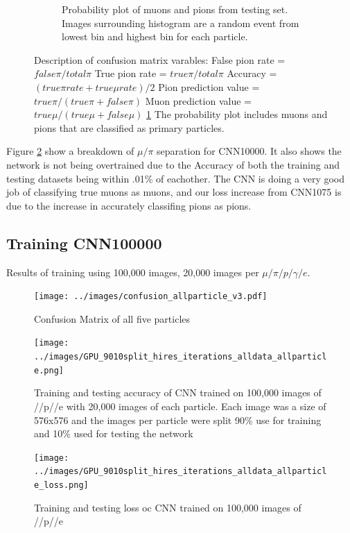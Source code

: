 \begin{figure}[htp!]
\begin{subfigure}[b]{\textwidth}
	\caption{Probability plot of muons and pions from testing set. Images surrounding histogram are a random event from lowest bin and highest bin for each particle.}
	\label{fig:prob_plot}
	\end{subfigure}
\caption{Description of confusion matrix varables: False pion rate = $false \pi/ total \pi$ True pion rate = $true \pi/total \pi$ Accuracy = $(true \pi rate + true \mu rate)/2$ Pion prediction value = $true \pi/(true \pi + false \pi)$ Muon prediction value = $true \mu/(true \mu + false \mu)$ \ref{fig:prob_plot} The probability plot includes muons and pions that are classified as primary particles.}
\label{fig:CNN_train}
\end{figure}

Figure \ref{fig:CNN_train} show a breakdown of $\mu/\pi$ separation for CNN10000. It also shows the network is not being overtrained due to the Accuracy of both the training and testing datasets being within .01\% of eachother. The CNN is doing a very good job of classifying true muons as muons, and our loss increase from CNN1075 is due to the increase in accurately classifing pions as pions. 



\subsection{Training CNN100000}
Results of training using 100,000 images, 20,000 images per $\mu/\pi/p/\gamma/e$. 


\begin{figure}[htp]
\centering
\texttt{[image: ../images/confusion\_allparticle\_v3.pdf]}
\caption{Confusion Matrix of all five particles }
\label{fig:confusion100000}
\end{figure}

\begin{figure}[htp]
\centering
\texttt{[image: ../images/GPU\_9010split\_hires\_iterations\_alldata\_allparticle.png]}
\caption{Training and testing accuracy of CNN trained on 100,000 images of \mu/\pi/p/\gamma/e with 20,000 images of each particle. Each image was a size of 576x576 and the images per particle were split 90\% use for training and 10\% used for testing the network}
\label{fig:gpuacc}
\end{figure}

\begin{figure}[htp]
\centering
\texttt{[image: ../images/GPU\_9010split\_hires\_iterations\_alldata\_allparticle\_loss.png]}
\caption{Training and testing loss oc CNN trained on 100,000 images of \mu/\pi/p/\gamma/e}
\label{fig:gpuloss}
\end{figure}

